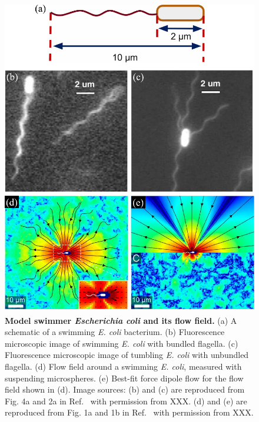 \begin{figure}[!h]
	\begin{center}
	\includegraphics[height=5.5in]{Figs/2-Exp/1.pdf}
	\end{center}
	\caption[Model swimmer \textit{Escherichia coli} and its flow field]
	{
	\textbf{Model swimmer \textit{Escherichia coli} and its flow field.}
  (a) A schematic of a swimming \textit{E. coli} bacterium.
  (b) Fluorescence microscopic image of swimming \textit{E. coli} with bundled flagella.
  (c) Fluorescence microscopic image of tumbling \textit{E. coli} with unbundled flagella.
  (d) Flow field around a swimming \textit{E. coli}, measured with suspending microspheres.
  (e) Best-fit force dipole flow for the flow field shown in (d).
  Image sources:
  (b) and (c) are reproduced from Fig. 4a and 2a in Ref.~\cite{Turner2000} with permission from XXX.
  (d) and (e) are reproduced from Fig. 1a and 1b in Ref.~\cite{Drescher2011} with permission from XXX.
	}
	\label{fig:2-1}
\end{figure}

